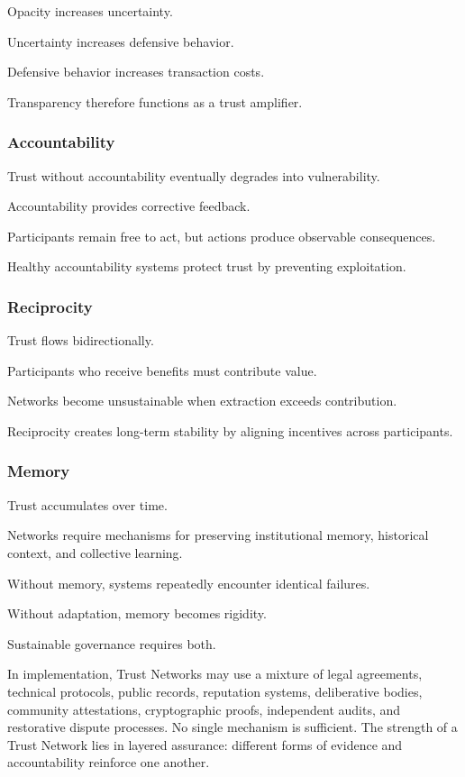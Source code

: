 \documentclass[12pt]{article}
\begin{document}
Opacity increases uncertainty.

Uncertainty increases defensive behavior.

Defensive behavior increases transaction costs.

Transparency therefore functions as a trust amplifier.

\subsubsection*{Accountability}

Trust without accountability eventually degrades into vulnerability.

Accountability provides corrective feedback.

Participants remain free to act, but actions produce observable consequences.

Healthy accountability systems protect trust by preventing exploitation.

\subsubsection*{Reciprocity}

Trust flows bidirectionally.

Participants who receive benefits must contribute value.

Networks become unsustainable when extraction exceeds contribution.

Reciprocity creates long-term stability by aligning incentives across participants.

\subsubsection*{Memory}

Trust accumulates over time.

Networks require mechanisms for preserving institutional memory, historical context, and collective learning.

Without memory, systems repeatedly encounter identical failures.

Without adaptation, memory becomes rigidity.

Sustainable governance requires both.

In implementation, Trust Networks may use a mixture of legal agreements, technical protocols, public records, reputation systems, deliberative bodies, community attestations, cryptographic proofs, independent audits, and restorative dispute processes. No single mechanism is sufficient. The strength of a Trust Network lies in layered assurance: different forms of evidence and accountability reinforce one another.
\end{document}
